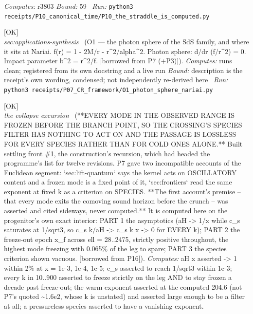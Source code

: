 \begin{description}
\emph{Computes:} r3803
 \emph{Bound:} 59
\ \emph{Run:} \texttt{python3 receipts/P10\_canonical\_time/P10\_the\_straddle\_is\_computed.py}
\item[\rcptlabel{O1_photon_sphere_nariai}{P7R16}\textbf{P7R16}\quad\texttt{O1\_photon\_sphere\_nariai}]\hfill\textsf{[OK]}\\
\textit{sec:applications-synthesis} \ (O1 --- the photon sphere of the SdS family, and where it sits at Nariai. f(r) = 1 - 2M/r - r\textasciicircum{}2/alpha\textasciicircum{}2. Photon sphere: d/dr (f/r\textasciicircum{}2) = 0. Impact parameter b\textasciicircum{}2 = r\textasciicircum{}2/f. [borrowed from P7 (+P3)]). 
\emph{Computes:} runs clean; registered from its own docstring and a live run
 \emph{Bound:} description is the receipt's own wording, condensed; not independently re-derived here
\ \emph{Run:} \texttt{python3 receipts/P07\_CR\_framework/O1\_photon\_sphere\_nariai.py}
\item[\rcptlabel{P16_every_mode_is_frozen_at_the_crossing}{P16R25}\textbf{P16R25}\quad\texttt{P16\_every\_mode\_is\_frozen\_at\_the\_crossing}]\hfill\textsf{[OK]}\\
\textit{the collapse excursion} \ (**EVERY MODE IN THE OBSERVED RANGE IS FROZEN BEFORE THE BRANCH POINT, SO THE CROSSING'S SPECIES FILTER HAS NOTHING TO ACT ON AND THE PASSAGE IS LOSSLESS FOR EVERY SPECIES RATHER THAN FOR COLD ONES ALONE.** Built settling front \#1, the construction's recursion, which had headed the programme's list for twelve revisions. P7 gave two incompatible accounts of the Euclidean segment: `sec:lift-quantum` says the kernel acts on OSCILLATORY content and a frozen mode is a fixed point of it, `sec:frontiers` read the same exponent at fixed k as a criterion on SPECIES. **The first account's premise -- that every mode exits the comoving sound horizon before the crunch -- was asserted and cited sideways, never computed.** It is computed here on the progenitor's own exact interior: PART 1 the asymptotics (\textbar{}aH\textbar{} -> 1/x while c\_s saturates at 1/sqrt3, so c\_s k/\textbar{}aH\textbar{} -> c\_s k x -> 0 for EVERY k); PART 2 the freeze-out epoch x\_f across ell = 28..2475, strictly positive throughout, the highest mode freezing with 0.065\% of the leg to spare; PART 3 the species criterion shown vacuous. [borrowed from P16]). 
\emph{Computes:} \textbar{}aH\textbar{} x asserted -> 1 within 2\% at x = 1e-3, 1e-4, 1e-5; c\_s asserted to reach 1/sqrt3 within 1e-3; every k in 10..900 asserted to freeze strictly on the leg AND to stay frozen a decade past freeze-out; the warm exponent asserted at the computed 204.6 (not P7's quoted \textasciitilde{}1.6e2, whose k is unstated) and asserted large enough to be a filter at all; a pressureless species asserted to have a vanishing exponent.

\end{description}
